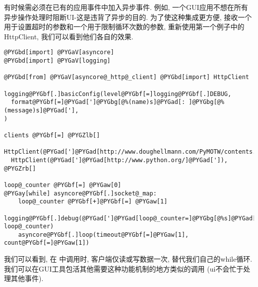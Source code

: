 \documentclass[a4paper,10pt,english]{manual}
\begin{document}
有时候需必须在已有的应用事件中加入异步事件. 例如, 一个GUI应用不想在所有异步操作处理时阻断UI-这是违背了异步的目的. 为了使这种集成更方便,  接收一个用于设置超时的参数和一个用于限制循环次数的参数, 重新使用第一个例子中的HttpClient, 我们可以看到他们各自的效果.

\begin{Verbatim}[commandchars=@\[\]]
@PYGbd[import] @PYGaV[asyncore]
@PYGbd[import] @PYGaV[logging]

@PYGbd[from] @PYGaV[asyncore@_http@_client] @PYGbd[import] HttpClient

logging@PYGbf[.]basicConfig(level@PYGbf[=]logging@PYGbf[.]DEBUG,
  format@PYGbf[=]@PYGad[']@PYGbg[@%(name)s]@PYGad[: ]@PYGbg[@%(message)s]@PYGad['],
)

clients @PYGbf[=] @PYGZlb[]
  HttpClient(@PYGad[']@PYGad[http://www.doughellmann.com/PyMOTW/contents.html]@PYGad[']),
  HttpClient(@PYGad[']@PYGad[http://www.python.org/]@PYGad[']),
@PYGZrb[]

loop@_counter @PYGbf[=] @PYGaw[0]
@PYGay[while] asyncore@PYGbf[.]socket@_map:
    loop@_counter @PYGbf[+]@PYGbf[=] @PYGaw[1]
    logging@PYGbf[.]debug(@PYGad[']@PYGad[loop@_counter=]@PYGbg[@%s]@PYGad['], loop@_counter)
    asyncore@PYGbf[.]loop(timeout@PYGbf[=]@PYGaw[1], count@PYGbf[=]@PYGaw[1])
\end{Verbatim}

我们可以看到, 在  中调用时, 客户端仅读或写数据一次, 替代我们自己的while循环. 我们可以在GUI工具包活其他需要这种功能机制的地方类似的调用  (ui不会忙于处理其他事件).
\end{document}
